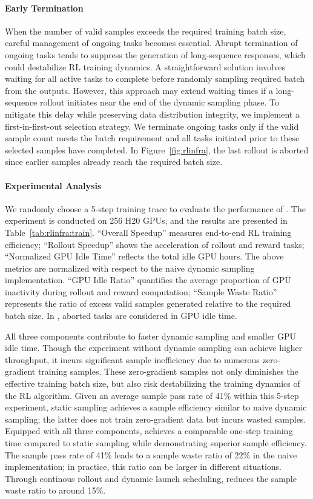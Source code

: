 \paragraph{Early Termination}
%
When the number of valid samples exceeds the required training batch size, careful management of ongoing tasks becomes essential. 
%
Abrupt termination of ongoing tasks tends to suppress the generation of long-sequence responses, which could destabilize RL training dynamics. 
%
A straightforward solution involves waiting for all active tasks to complete before randomly sampling required batch from the outputs. 
%
However, this approach may extend waiting times if a long-sequence rollout initiates near the end of the dynamic sampling phase. 
%
To mitigate this delay while preserving data distribution integrity, we implement a first-in-first-out selection strategy.
%
We terminate ongoing tasks only if the valid sample count meets the batch requirement and all tasks initiated prior to these selected samples have completed.
%
In Figure~\ref{fig:rlinfra}, the last rollout is aborted since earlier samples already reach the required batch size.



\paragraph{Experimental Analysis}
%
We randomly choose a 5-step training trace to evaluate the performance of \rlsys{}.
%
The experiment is conducted on 256 H20 GPUs, and the results are presented in Table~\ref{tab:rlinfra:train}.
%
``Overall Speedup'' measures end-to-end RL training efficiency; ``Rollout Speedup'' shows the acceleration of rollout and reward tasks; ``Normalized GPU Idle Time'' reflects the total idle GPU hours.
%
The above metrics are normalized with respect to the naive dynamic sampling implementation.
%
``GPU Idle Ratio'' quantifies the average proportion of GPU inactivity during rollout and reward computation; ``Sample Waste Ratio'' represents the ratio of excess valid samples generated relative to the required batch size.
%
In \rlsys{}, aborted tasks are considered in GPU idle time.
%

All three components contribute to faster dynamic sampling and smaller GPU idle time.
%
Though the experiment without dynamic sampling can achieve higher throughput, it incurs significant sample inefficiency due to numerous zero-gradient training samples.
%
These zero-gradient samples not only diminishes the effective training batch size, but also risk destabilizing the training dynamics of the RL algorithm.
%
Given an average sample pass rate of 41\% within this 5-step experiment, static sampling achieves a sample efficiency similar to naive dynamic sampling; the latter does not train zero-gradient data but incurs wasted samples.
%
Equipped with all three components, \rlsys{} achieves a comparable one-step training time compared to static sampling while demonstrating superior sample efficiency.
%
The sample pass rate of 41\% leads to a sample waste ratio of 22\% in the naive implementation; in practice, this ratio can be larger in different situations.
%
Through continous rollout and dynamic launch scheduling, \rlsys{} reduces the sample waste ratio to around 15\%.

